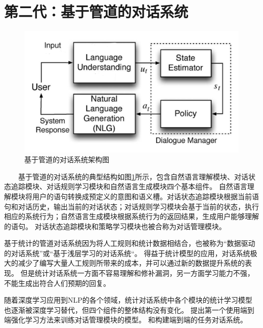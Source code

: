 \documentclass{clv3}
\begin{document}
\section{第二代：基于管道的对话系统} %
\begin{figure}[h] %
    \centering %
    \includegraphics[width=1\textwidth]{pipeline_model} %
    \caption{基于管道的对话系统架构图} %
    \label{pipeline_model} %
\end{figure}%
$\qquad$基于管道的对话系统的典型结构如图\ref{pipeline_model}所示，包含自然语言理解模块、对话状态追踪模块、对话规则学习模块和自然语言生成模块四个基本组件\cite{rudnicky1999creating, zue2000juplter, zue2000conversational}。
自然语言理解模块将用户的语句转换成预定义的意图和语义槽。对话状态追踪模块根据当前语句和对话历史，输出当前的对话状态；对话规则学习模块会基于当前的状态，执行相应的系统行为；自然语言生成模块根据系统行为的返回结果，生成用户能够理解的语句。
对话状态追踪模块和策略学习模块也被合称为对话管理模块。

基于统计的管道对话系统因为将人工规则和统计数据相结合，也被称为“数据驱动的对话系统”或“基于浅层学习的对话系统“。
得益于统计模型的应用，对话系统极大的减少了编写大量人工规则所带来的成本，并可以通过新的数据提升系统的表现。
但是统计对话系统一方面不容易理解和修补漏洞，另一方面学习能力不强，不能生成出符合人们预期的回复。

随着深度学习应用到NLP的各个领域，统计对话系统中各个模块的统计学习模型也逐渐被深度学习替代，但四个组件的整体结构没有变化。
\cite{zhao2016towards}提出第一个使用端到端强化学习方法来训练对话管理模块的模型。
\cite{wen2017a}和\cite{bordes2017learning}构建端到端的任务对话系统。
\end{document}
